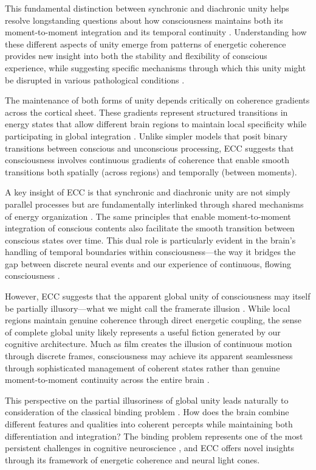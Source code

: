 This fundamental distinction between synchronic and diachronic unity helps resolve longstanding questions about how consciousness maintains both its moment-to-moment integration and its temporal continuity \cite{vanrullen2003perception}. Understanding how these different aspects of unity emerge from patterns of energetic coherence provides new insight into both the stability and flexibility of conscious experience, while suggesting specific mechanisms through which this unity might be disrupted in various pathological conditions \cite{fell2011role}.

The maintenance of both forms of unity depends critically on coherence gradients across the cortical sheet. These gradients represent structured transitions in energy states that allow different brain regions to maintain local specificity while participating in global integration \cite{adhikari2010cross}. Unlike simpler models that posit binary transitions between conscious and unconscious processing, ECC suggests that consciousness involves continuous gradients of coherence that enable smooth transitions both spatially (across regions) and temporally (between moments).

A key insight of ECC is that synchronic and diachronic unity are not simply parallel processes but are fundamentally interlinked through shared mechanisms of energy organization \cite{wang2010neurophysiological}. The same principles that enable moment-to-moment integration of conscious contents also facilitate the smooth transition between conscious states over time. This dual role is particularly evident in the brain's handling of temporal boundaries within consciousness—the way it bridges the gap between discrete neural events and our experience of continuous, flowing consciousness \cite{vanrullen2003perception}.

However, ECC suggests that the apparent global unity of consciousness may itself be partially illusory—what we might call the framerate illusion \cite{panzeri2010sensory, harris2019conscious}. While local regions maintain genuine coherence through direct energetic coupling, the sense of complete global unity likely represents a useful fiction generated by our cognitive architecture. Much as film creates the illusion of continuous motion through discrete frames, consciousness may achieve its apparent seamlessness through sophisticated management of coherent states rather than genuine moment-to-moment continuity across the entire brain \cite{crick1990towards}.

This perspective on the partial illusoriness of global unity leads naturally to consideration of the classical binding problem \cite{roskies1999binding}. How does the brain combine different features and qualities into coherent percepts while maintaining both differentiation and integration? The binding problem represents one of the most persistent challenges in cognitive neuroscience \cite{treisman1996binding}, and ECC offers novel insights through its framework of energetic coherence and neural light cones.

